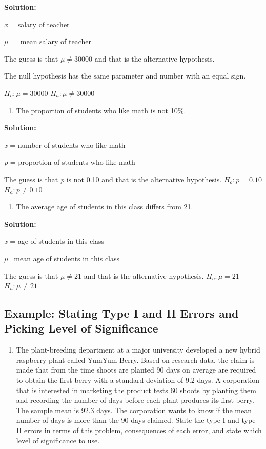 \documentclass[
]{book}
\providecommand{\tightlist}{%
  \setlength{\itemsep}{0pt}\setlength{\parskip}{0pt}}
\begin{document}
\textbf{Solution:}

\emph{x} = salary of teacher

\(\mu=\) mean salary of teacher

The guess is that \(\mu\ne30000\) and that is the alternative hypothesis.

The null hypothesis has the same parameter and number with an equal sign.

\(H_o:\mu=30000\)
\(H_a:\mu\ne30000\)

\begin{enumerate}
\def\labelenumi{\alph{enumi}.}
\setcounter{enumi}{1}
\tightlist
\item
  The proportion of students who like math is not 10\%.
\end{enumerate}

\textbf{Solution:}

\emph{x} = number of students who like math

\emph{p} = proportion of students who like math

The guess is that \emph{p} is not 0.10 and that is the alternative hypothesis.
\(H_o:p=0.10\)
\(H_a:p\ne0.10\)

\begin{enumerate}
\def\labelenumi{\alph{enumi}.}
\setcounter{enumi}{2}
\tightlist
\item
  The average age of students in this class differs from 21.
\end{enumerate}

\textbf{Solution:}

\emph{x} = age of students in this class

\(\mu\)=mean age of students in this class

The guess is that \(\mu\ne21\) and that is the alternative hypothesis.
\(H_o:\mu=21\)
\(H_a:\mu\ne21\)

\hypertarget{example-stating-type-i-and-ii-errors-and-picking-level-of-significance}{%
\subsection{Example: Stating Type I and II Errors and Picking Level of Significance}\label{example-stating-type-i-and-ii-errors-and-picking-level-of-significance}}

\begin{enumerate}
\def\labelenumi{\alph{enumi}.}
\tightlist
\item
  The plant-breeding department at a major university developed a new hybrid raspberry plant called YumYum Berry. Based on research data, the claim is made that from the time shoots are planted 90 days on average are required to obtain the first berry with a standard deviation of 9.2 days. A corporation that is interested in marketing the product tests 60 shoots by planting them and recording the number of days before each plant produces its first berry. The sample mean is 92.3 days. The corporation wants to know if the mean number of days is more than the 90 days claimed. State the type I and type II errors in terms of this problem, consequences of each error, and state which level of significance to use.
\end{enumerate}
\end{document}
